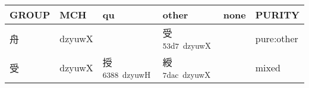 \documentclass[14pt,a4paper]{scrartcl}
\begin{document}
\begin{longtable}[c]{@{}llllll@{}}
\toprule
\begin{minipage}[b]{0.14\columnwidth}\raggedright\strut
GROUP
\strut\end{minipage} &
\begin{minipage}[b]{0.14\columnwidth}\raggedright\strut
MCH
\strut\end{minipage} &
\begin{minipage}[b]{0.14\columnwidth}\raggedright\strut
qu
\strut\end{minipage} &
\begin{minipage}[b]{0.14\columnwidth}\raggedright\strut
other
\strut\end{minipage} &
\begin{minipage}[b]{0.14\columnwidth}\raggedright\strut
none
\strut\end{minipage} &
\begin{minipage}[b]{0.14\columnwidth}\raggedright\strut
PURITY
\strut\end{minipage}\tabularnewline
\midrule
\endhead
\begin{minipage}[t]{0.14\columnwidth}\raggedright\strut
舟
\strut\end{minipage} &
\begin{minipage}[t]{0.14\columnwidth}\raggedright\strut
dzyuwX
\strut\end{minipage} &
\begin{minipage}[t]{0.14\columnwidth}\raggedright\strut
\strut\end{minipage} &
\begin{minipage}[t]{0.14\columnwidth}\raggedright\strut
受\textsuperscript{53d7~dzyuwX}
\strut\end{minipage} &
\begin{minipage}[t]{0.14\columnwidth}\raggedright\strut
\strut\end{minipage} &
\begin{minipage}[t]{0.14\columnwidth}\raggedright\strut
pure:other
\strut\end{minipage}\tabularnewline
\begin{minipage}[t]{0.14\columnwidth}\raggedright\strut
受
\strut\end{minipage} &
\begin{minipage}[t]{0.14\columnwidth}\raggedright\strut
dzyuwX
\strut\end{minipage} &
\begin{minipage}[t]{0.14\columnwidth}\raggedright\strut
授\textsuperscript{6388~dzyuwH}
\strut\end{minipage} &
\begin{minipage}[t]{0.14\columnwidth}\raggedright\strut
綬\textsuperscript{7dac~dzyuwX}
\strut\end{minipage} &
\begin{minipage}[t]{0.14\columnwidth}\raggedright\strut
\strut\end{minipage} &
\begin{minipage}[t]{0.14\columnwidth}\raggedright\strut
mixed
\strut\end{minipage}\tabularnewline
\bottomrule
\end{longtable}
\end{document}
